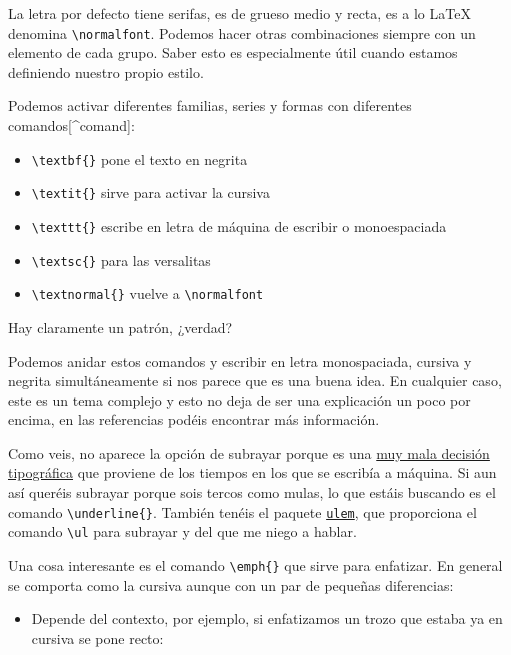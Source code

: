 La letra por defecto tiene serifas, es de grueso medio y recta, es a lo
LaTeX denomina \lstinline!\normalfont!. Podemos hacer otras
combinaciones siempre con un elemento de cada grupo. Saber esto es
especialmente útil cuando estamos definiendo nuestro propio estilo.

Podemos activar diferentes familias, series y formas con diferentes
comandos{[}\^{}comand{]}:

\begin{itemize}
\itemsep1pt\parskip0pt
\item
  \lstinline!\textbf{}! pone el texto en negrita
\item
  \lstinline!\textit{}! sirve para activar la cursiva
\item
  \lstinline!\texttt{}! escribe en letra de máquina de escribir o
  monoespaciada
\item
  \lstinline!\textsc{}! para las versalitas
\item
  \lstinline!\textnormal{}! vuelve a \lstinline!\normalfont!
\end{itemize}

Hay claramente un patrón, ¿verdad?

Podemos anidar estos comandos y escribir en letra monospaciada, cursiva
y negrita simultáneamente si nos parece que es una buena idea. En
cualquier caso, este es un tema complejo y esto no deja de ser una
explicación un poco por encima, en las referencias podéis encontrar más
información.

Como veis, no aparece la opción de subrayar porque es una
\href{http://practicaltypography.com/underlining.html}{muy mala decisión
tipográfica} que proviene de los tiempos en los que se escribía a
máquina. Si aun así queréis subrayar porque sois tercos como mulas, lo
que estáis buscando es el comando \lstinline!\underline{}!. También
tenéis el paquete \href{http://www.ctan.org/pkg/ulem}{\lstinline!ulem!},
que proporciona el comando \lstinline!\ul! para subrayar y del que me
niego a hablar.

Una cosa interesante es el comando \lstinline!\emph{}! que sirve para
enfatizar. En general se comporta como la cursiva aunque con un par de
pequeñas diferencias:

\begin{itemize}
\itemsep1pt\parskip0pt
\item
  Depende del contexto, por ejemplo, si enfatizamos un trozo que estaba
  ya en cursiva se pone recto:
\end{itemize}

